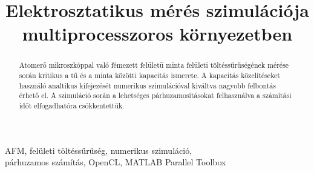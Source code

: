 \documentclass[9pt,conference, a4paper]{IEEEtran}
\begin{document}
	\title{Elektrosztatikus mérés szimulációja multiprocesszoros környezetben}
	
	\author{
		  
		\and
		 
	}
	
	\maketitle

	\begin{abstract}
	 Atomerő mikroszkóppal való fémezett felületü minta felületi töltéssűrűségének mérése során
	 kritikus a tű és a minta közötti kapacitás ismerete. A kapacitás közelítéseket használó analtikus
	 kifejezését numerikus szimulációval kiváltva nagyobb felbontás érhető el.
	 A szimuláció során a lehetséges párhuzamosításokat felhasználva a számítási időt elfogadhatóra
	 csökkentettük.
	\end{abstract}

	\begin{IEEEkeywords}
	 AFM, felületi töltéssűrűség, numerikus szimuláció, \\ párhuzamos számítás, OpenCL, MATLAB Parallel
	 Toolbox
	\end{IEEEkeywords}

	
	
	
	
	
	
	
	
	
	
	
	
	
	
	
\end{document}
